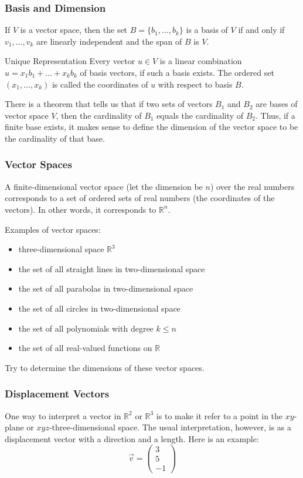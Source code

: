 \documentclass[xcolor=dvipsnames]{beamer}
\begin{document}
\begin{frame}
  \frametitle{Basis and Dimension}
  If $V$ is a vector space, then the set $B=\{b_{1},{\ldots},b_{k}\}$
  is a \alert{basis} of $V$ if and only if $v_{1},{\ldots},v_{k}$ are linearly
  independent and the span of $B$ is $V$.
  \begin{block}{Unique Representation}
    Every vector $u\in{}V$ is a linear combination
    $u=x_{1}b_{1}+{\ldots}+x_{k}b_{k}$ of basis vectors, if such a basis
    exists. The ordered set $(x_{1},{\ldots},x_{k})$ is called the
    \alert{coordinates} of $u$ with respect to basis $B$. 
  \end{block}
  There is a theorem that tells us that if two sets of vectors $B_{1}$
  and $B_{2}$ are bases of vector space $V$, then the cardinality of
  $B_{1}$ equals the cardinality of $B_{2}$. Thus, if a finite base
  exists, it makes sense to define the \alert{dimension} of the vector
  space to be the cardinality of that base.
\end{frame}

\begin{frame}
  \frametitle{Vector Spaces}
  A finite-dimensional vector space (let the dimension be $n$) over
  the real numbers corresponds to a set of ordered sets of real
  numbers (the coordinates of the vectors). In other words, it
  corresponds to $\mathbb{R}^{n}$. 

\medskip

Examples of vector spaces:
\begin{itemize}
\item three-dimensional space $\mathbb{R}^{3}$
\item the set of all straight lines in two-dimensional space
\item the set of all parabolas in two-dimensional space
\item the set of all circles in two-dimensional space
\item the set of all polynomials with degree $k\leq{}n$
\item the set of all real-valued functions on $\mathbb{R}$
\end{itemize}
Try to determine the dimensions of these vector spaces.
\end{frame}

\begin{frame}
  \frametitle{Displacement Vectors}
  One way to interpret a vector in $\mathbb{R}^{2}$ or
  $\mathbb{R}^{3}$ is to make it refer to a point in the
  $xy$-plane or $xyz$-three-dimensional space. The usual
  interpretation, however, is as a \alert{displacement vector} with a
  direction and a length. Here is an example:
  \begin{equation}
    \label{eq:lapheeka}
    \vec{v}=\left(
    \begin{array}{c}
      3 \\
      5 \\
      -1
    \end{array}\right)
  \end{equation}
\end{frame}
\end{document}
